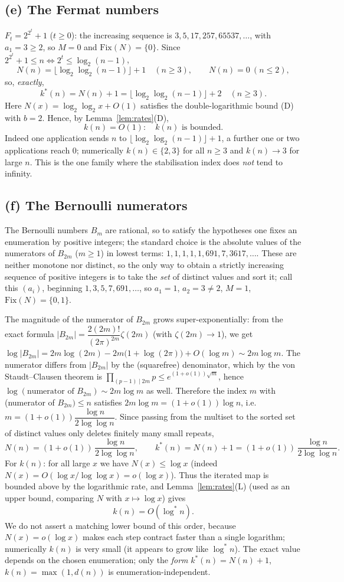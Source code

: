 \documentclass[12pt]{article}
\theoremstyle{definition}
\begin{document}
\subsection{(e) The Fermat numbers}
$F_t=2^{2^t}+1$ ($t\ge0$): the increasing sequence is $3,5,17,257,65537,\dots$, with
$a_1=3\ge2$, so $M=0$ and $\mathrm{Fix}(N)=\{0\}$. Since $2^{2^t}+1\le n\iff
2^t\le\log_2(n-1)$,
\[
  N(n)=\bigl\lfloor\log_2\log_2(n-1)\bigr\rfloor+1\quad(n\ge3),\qquad N(n)=0\ (n\le2),
\]
so, \emph{exactly},
\[
  k^*(n)=N(n)+1=\bigl\lfloor\log_2\log_2(n-1)\bigr\rfloor+2\quad(n\ge3).
\]
Here $N(x)=\log_2\log_2 x+O(1)$ satisfies the double-logarithmic bound (D) with
$b=2$. Hence, by Lemma~\ref{lem:rates}(D),
\[
  k(n)=O(1):\quad\text{$k(n)$ is bounded.}
\]
Indeed one application sends $n$ to $\lfloor\log_2\log_2(n-1)\rfloor+1$, a further one
or two applications reach $0$; numerically $k(n)\in\{2,3\}$ for all $n\ge3$ and
$k(n)\to 3$ for large $n$. This is the one family where the stabilisation index does
\emph{not} tend to infinity.

\subsection{(f) The Bernoulli numerators}
The Bernoulli numbers $B_m$ are rational, so to satisfy the hypotheses one fixes an
enumeration by positive integers; the standard choice is the absolute values of the
numerators of $B_{2m}$ ($m\ge1$) in lowest terms:
$1,1,1,1,1,691,7,3617,\dots$. These are neither monotone nor distinct, so the only
way to obtain a strictly increasing sequence of positive integers is to take the
\emph{set} of distinct values and sort it; call this $(a_i)$, beginning
$1,3,5,7,691,\dots$, so $a_1=1$, $a_2=3\ne2$, $M=1$, $\mathrm{Fix}(N)=\{0,1\}$.

The magnitude of the numerator of $B_{2m}$ grows super-exponentially: from the exact
formula $|B_{2m}|=\dfrac{2(2m)!}{(2\pi)^{2m}}\zeta(2m)$ (with $\zeta(2m)\to1$), we get
$\log|B_{2m}|=2m\log(2m)-2m\bigl(1+\log(2\pi)\bigr)+O(\log m)\sim 2m\log m$. The
numerator differs from $|B_{2m}|$ by the (squarefree) denominator, which by the von
Staudt--Clausen theorem is $\prod_{(p-1)\mid 2m}p\le e^{(1+o(1))\sqrt{m}}$, hence
$\log(\text{numerator of }B_{2m})\sim 2m\log m$ as well. Therefore the index $m$ with
(numerator of $B_{2m})\le n$ satisfies $2m\log m=(1+o(1))\log n$, i.e.
$m=(1+o(1))\dfrac{\log n}{2\log\log n}$. Since passing from the multiset to the sorted
set of distinct values only deletes finitely many small repeats,
\[
  N(n)=(1+o(1))\,\frac{\log n}{2\log\log n},\qquad
  k^*(n)=N(n)+1=(1+o(1))\,\frac{\log n}{2\log\log n}.
\]
For $k(n)$: for all large $x$ we have $N(x)\le\log x$ (indeed
$N(x)=O(\log x/\log\log x)=o(\log x)$). Thus the iterated map is bounded above by the
logarithmic rate, and Lemma~\ref{lem:rates}(L) (used as an upper bound, comparing $N$
with $x\mapsto\log x$) gives
\[
  k(n)=O(\log^* n).
\]
We do not assert a matching lower bound of this order, because $N(x)=o(\log x)$ makes
each step contract faster than a single logarithm; numerically $k(n)$ is very small
(it appears to grow like $\log^* n$). The exact value depends on the chosen
enumeration; only the \emph{form} $k^*(n)=N(n)+1$, $k(n)=\max(1,d(n))$ is
enumeration-independent.
\end{document}
